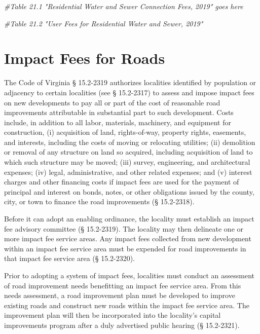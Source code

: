 \documentclass[
]{book}
\newenvironment{Shaded}{\begin{snugshade}}{\end{snugshade}}
\newcommand{\CommentTok}[1]{\textcolor[rgb]{0.56,0.35,0.01}{\textit{#1}}}
\begin{document}
\begin{Shaded}
\begin{Highlighting}[]
\CommentTok{\#Table 21.1 "Residential Water and Sewer Connection Fees, 2019" goes here}

\CommentTok{\#Table 21.2 "User Fees for Residential Water and Sewer, 2019"}
\end{Highlighting}
\end{Shaded}

\hypertarget{impact-fees-for-roads}{%
\chapter{Impact Fees for Roads}\label{impact-fees-for-roads}}

The Code of Virginia § 15.2-2319 authorizes localities identified by population or adjacency to certain localities (see § 15.2-2317) to assess and impose impact fees on new developments to pay all or part of the cost of reasonable road improvements attributable in substantial part to such development. Costs include, in addition to all labor, materials, machinery, and equipment for construction, (i) acquisition of land, rights-of-way, property rights, easements, and interests, including the costs of moving or relocating utilities; (ii) demolition or removal of any structure on land so acquired, including acquisition of land to which such structure may be moved; (iii) survey, engineering, and architectural expenses; (iv) legal, administrative, and other related expenses; and (v) interest charges and other financing costs if impact fees are used for the payment of principal and interest on bonds, notes, or other obligations issued by the county, city, or town to finance the road improvements (§ 15.2-2318).

Before it can adopt an enabling ordinance, the locality must establish an impact fee advisory committee (§ 15.2-2319). The locality may then delineate one or more impact fee service areas. Any impact fees collected from new development within an impact fee service area must be expended for road improvements in that impact fee service area (§ 15.2-2320).

Prior to adopting a system of impact fees, localities must conduct an assessment of road improvement needs benefitting an impact fee service area. From this needs assessment, a road improvement plan must be developed to improve existing roads and construct new roads within the impact fee service area. The improvement plan will then be incorporated into the locality's capital improvements program after a duly advertised public hearing (§ 15.2-2321).
\end{document}
